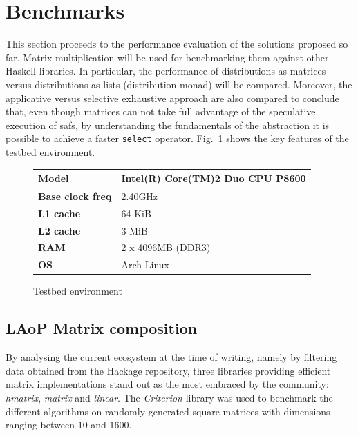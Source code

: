 \documentclass[
  oneside,
  11pt, a4paper,
  footinclude=true,
  headinclude=true,
  cleardoublepage=empty
]{scrbook}
\theoremstyle{definition}
\theoremstyle{definition}
\begin{document}
        \section{Benchmarks}
        
        This section proceeds to the performance evaluation of the solutions proposed so far. Matrix multiplication will be used for benchmarking  them against other Haskell libraries.
        In particular, the performance of distributions as matrices versus distributions as lists (distribution monad) will be compared. Moreover, the applicative versus selective exhaustive approach are also compared to conclude that, even though matrices can not take full advantage of the speculative execution of \glspl{saf}, by understanding the fundamentals of the abstraction it is possible to achieve a faster \texttt{select} operator. Fig.~\ref{tab:testbed} shows the key features of the testbed environment.
        \begin{figure}[H]%
        \centering\small
        \begin{tabular}{|l|l|}
        \hline
        \textbf{Model} & Intel(R) Core(TM)2 Duo CPU P8600 \\ \hline
        \textbf{Base clock freq} & 2.40GHz \\ \hline
        \textbf{L1 cache} & 64 KiB \\ \hline
        \textbf{L2 cache} & 3 MiB \\ \hline
        \textbf{RAM} & 2 x 4096MB (DDR3) \\ \hline
        \textbf{OS} & Arch Linux \\ \hline
        \end{tabular}
        \caption{Testbed environment \label{tab:testbed}}
        \end{figure}
        
        \subsection{LAoP Matrix composition}
        
    By analysing the current ecosystem at the time of writing, namely by filtering data obtained from the Hackage repository, three libraries providing efficient matrix implementations stand out as the most embraced by the community: \emph{hmatrix}, \emph{matrix} and \emph{linear}. The \emph{Criterion} library was used to benchmark the different algorithms on randomly generated square matrices with dimensions ranging between $10$ and $1600$.
    
\end{document}
